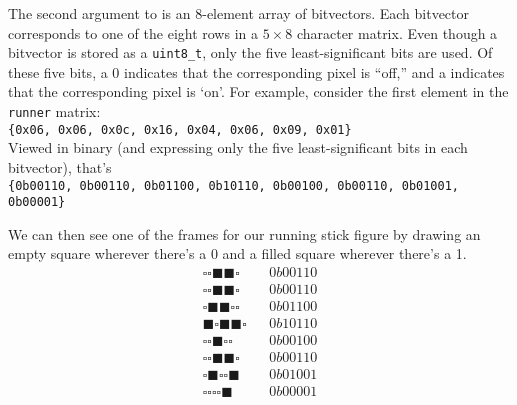 {    The second argument to  is an 8-element array of bitvectors.
    Each bitvector corresponds to one of the eight rows in a $5 \times 8$ character matrix.
    Even though a bitvector is stored as a \texttt{uint8\_t}, only the five least-significant bits are used.
    Of these five bits, a 0 indicates that the corresponding pixel is ``off,'' and a indicates that the corresponding pixel is `on'.
    For example, consider the first element in the \lstinline{runner} matrix: \\
    \texttt{\{0x06, 0x06, 0x0c, 0x16, 0x04, 0x06, 0x09, 0x01\}} \\
    Viewed in binary (and expressing only the five least-significant bits in each bitvector), that's \\
    \texttt{\{0b00110, 0b00110, 0b01100, 0b10110, 0b00100, 0b00110, 0b01001, 0b00001\}}

    We can then see one of the frames for our running stick figure by drawing an empty square wherever there's a 0 and a filled square wherever there's a 1.
    \begin{align*}
        \square\square\blacksquare\blacksquare\square       & & 0b00110 \\[-8pt]
        \square\square\blacksquare\blacksquare\square       & & 0b00110 \\[-8pt]
        \square\blacksquare\blacksquare\square\square       & & 0b01100 \\[-8pt]
        \blacksquare\square\blacksquare\blacksquare\square  & & 0b10110 \\[-8pt]
        \square\square\blacksquare\square\square            & & 0b00100 \\[-8pt]
        \square\square\blacksquare\blacksquare\square       & & 0b00110 \\[-8pt]
        \square\blacksquare\square\square\blacksquare       & & 0b01001 \\[-8pt]
        \square\square\square\square\blacksquare            & & 0b00001
    \end{align*}
}{}
